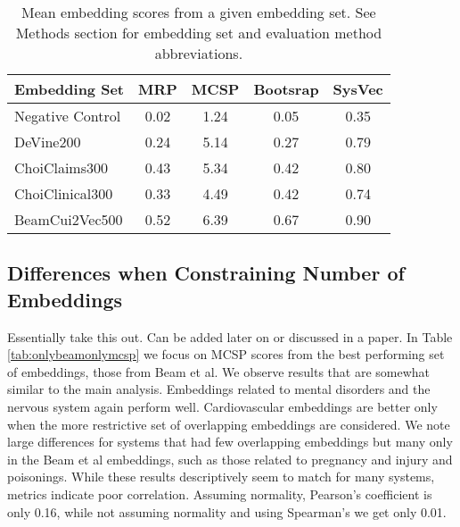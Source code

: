 \documentclass[11pt,a4paper]{article}
\def\red#1{{\color{red}#1}}
\begin{document}
\begin{table*}[h]
	\begin{center}
	
	\label{tab:allembedresults}
	\begin{tabular}{l|c|c|c|c}
			            Embedding Set &MRP 	        &MCSP              &Bootsrap 	  &SysVec \\
			            \hline
		Negative Control& 0.02 & 1.24 & 0.05 & 0.35 \\	            
		DeVine200       & 0.24 & 5.14 &	0.27 & 0.79 \\
		ChoiClaims300   & 0.43 & 5.34 &	0.42 & 0.80 \\ 
		ChoiClinical300	& 0.33 & 4.49 &	0.42 & 0.74 \\
		BeamCui2Vec500	& 0.52 & 6.39 & 0.67 & 0.90 \\
	\end{tabular}
\caption{Mean embedding scores from a given embedding set.  See Methods section for embedding set and evaluation method abbreviations.}
\end{center}
\end{table*}

\subsection{Differences when Constraining Number of Embeddings}
\red{Essentially take this out. Can be added later on or discussed in a paper. }
In Table \ref{tab:onlybeamonlymcsp} we focus on MCSP scores from the best performing set of embeddings, those from Beam et al. We observe results that are somewhat similar to the main  analysis. Embeddings related to mental disorders and the nervous system again perform well. Cardiovascular embeddings are better only when the more restrictive set of overlapping embeddings are considered. We note large differences for systems that had few overlapping embeddings but many only in the Beam et al embeddings, such as those related to pregnancy and injury and poisonings.  While these results descriptively seem to match for many systems, metrics indicate poor correlation. Assuming normality, Pearson's coefficient is only 0.16, while not assuming normality and using Spearman's we get only 0.01. 
\end{document}
